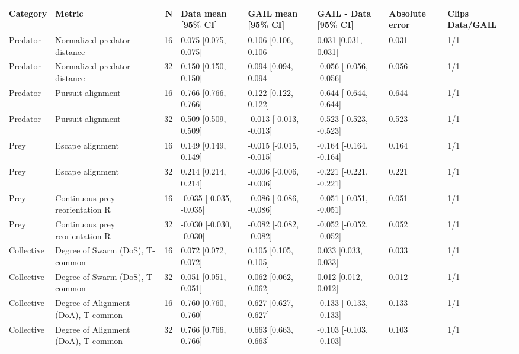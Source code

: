 \begin{tabular}{llrlllll}
\toprule
Category & Metric & N & Data mean [95\% CI] & GAIL mean [95\% CI] & GAIL - Data [95\% CI] & Absolute error & Clips Data/GAIL \\
\midrule
Predator & Normalized predator distance & 16 & 0.075 [0.075, 0.075] & 0.106 [0.106, 0.106] & 0.031 [0.031, 0.031] & 0.031 & 1/1 \\
Predator & Normalized predator distance & 32 & 0.150 [0.150, 0.150] & 0.094 [0.094, 0.094] & -0.056 [-0.056, -0.056] & 0.056 & 1/1 \\
Predator & Pursuit alignment & 16 & 0.766 [0.766, 0.766] & 0.122 [0.122, 0.122] & -0.644 [-0.644, -0.644] & 0.644 & 1/1 \\
Predator & Pursuit alignment & 32 & 0.509 [0.509, 0.509] & -0.013 [-0.013, -0.013] & -0.523 [-0.523, -0.523] & 0.523 & 1/1 \\
Prey & Escape alignment & 16 & 0.149 [0.149, 0.149] & -0.015 [-0.015, -0.015] & -0.164 [-0.164, -0.164] & 0.164 & 1/1 \\
Prey & Escape alignment & 32 & 0.214 [0.214, 0.214] & -0.006 [-0.006, -0.006] & -0.221 [-0.221, -0.221] & 0.221 & 1/1 \\
Prey & Continuous prey reorientation R & 16 & -0.035 [-0.035, -0.035] & -0.086 [-0.086, -0.086] & -0.051 [-0.051, -0.051] & 0.051 & 1/1 \\
Prey & Continuous prey reorientation R & 32 & -0.030 [-0.030, -0.030] & -0.082 [-0.082, -0.082] & -0.052 [-0.052, -0.052] & 0.052 & 1/1 \\
Collective & Degree of Swarm (DoS), T-common & 16 & 0.072 [0.072, 0.072] & 0.105 [0.105, 0.105] & 0.033 [0.033, 0.033] & 0.033 & 1/1 \\
Collective & Degree of Swarm (DoS), T-common & 32 & 0.051 [0.051, 0.051] & 0.062 [0.062, 0.062] & 0.012 [0.012, 0.012] & 0.012 & 1/1 \\
Collective & Degree of Alignment (DoA), T-common & 16 & 0.760 [0.760, 0.760] & 0.627 [0.627, 0.627] & -0.133 [-0.133, -0.133] & 0.133 & 1/1 \\
Collective & Degree of Alignment (DoA), T-common & 32 & 0.766 [0.766, 0.766] & 0.663 [0.663, 0.663] & -0.103 [-0.103, -0.103] & 0.103 & 1/1 \\
\bottomrule
\end{tabular}
